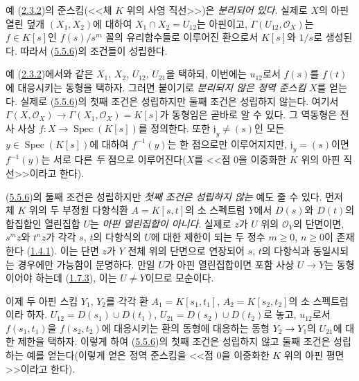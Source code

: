 \begin{examples}[5.5.11]
\label{I.5.5.11-ko}
예 (\hyperref[I.2.3.2-ko]{2.3.2})의 준스킴(<<체 $K$ 위의 사영
직선>>)은 \emph{분리되어 있다}. 실제로 $X$의 아핀 열린 덮개
$(X_1,X_2)$에 대하여 $X_1\cap X_2=U_{12}$는 아핀이고,
$\Gamma(U_{12},\mathscr{O}_X)$는 $f\in K[s]$인
$f(s)/s^m$ 꼴의 유리함수들로 이루어진 환으로서 $K[s]$와 $1/s$로
생성된다. 따라서 (\hyperref[I.5.5.6-ko]{5.5.6})의 조건들이
성립한다.

예 (\hyperref[I.2.3.2-ko]{2.3.2})에서와 같은 $X_1$, $X_2$,
$U_{12}$, $U_{21}$을 택하되, 이번에는 $u_{12}$로서 $f(s)$를
$f(t)$에 대응시키는 동형을 택하자. 그러면 붙이기로 \emph{분리되지
않은 정역 준스킴} $X$를 얻는다. 실제로
(\hyperref[I.5.5.6-ko]{5.5.6})의 첫째 조건은 성립하지만 둘째 조건은
성립하지 않는다. 여기서
$\Gamma(X,\mathscr{O}_X)\to\Gamma(X_1,\mathscr{O}_X)=K[s]$가
동형임은 곧바로 알 수 있다. 그 역동형은 전사 사상
$f:X\to\operatorname{Spec}(K[s])$를 정의한다. 또한
$\mathfrak{j}_y\neq(s)$인 모든
$y\in\operatorname{Spec}(K[s])$에 대하여 $f^{-1}(y)$는 한 점으로만
이루어지지만, $\mathfrak{j}_y=(s)$이면 $f^{-1}(y)$는 서로 다른
\emph{두} 점으로 이루어진다($X$를 <<점 $0$을 이중화한 $K$ 위의
아핀 직선>>이라고 한다).

(\hyperref[I.5.5.6-ko]{5.5.6})의 둘째 조건은 성립하지만
\emph{첫째 조건은 성립하지 않는} 예도 줄 수 있다. 먼저 체 $K$ 위의 두 부정원 다항식환
$A=K[s,t]$의 소 스펙트럼 $Y$에서 $D(s)$와 $D(t)$의 합집합인
열린집합 $U$는 \emph{아핀 열린집합이 아니다}. 실제로 $z$가 $U$ 위의
$\mathscr{O}_Y$의 단면이면, $s^m z$와 $t^n z$가 각각 $s$, $t$의
다항식의 $U$에 대한 제한이 되는 두 정수 $m\geq0$, $n\geq0$이
존재한다 (\hyperref[I.1.4.1-ko]{1.4.1}). 이는 단면 $z$가 $Y$ 전체
위의 단면으로 연장되어 $s$, $t$의 다항식과 동일시되는 경우에만
가능함이 분명하다. 만일 $U$가 아핀 열린집합이면 포함 사상
$U\to Y$는 동형이어야 하는데 (\hyperref[I.1.7.3-ko]{1.7.3}), 이는
$U\neq Y$이므로 모순이다.

이제 두 아핀 스킴 $Y_1$, $Y_2$를 각각 환
$A_1=K[s_1,t_1]$, $A_2=K[s_2,t_2]$의 소 스펙트럼이라 하자.
$U_{12}=D(s_1)\cup D(t_1)$,
$U_{21}=D(s_2)\cup D(t_2)$로 놓고, $u_{12}$로서
$f(s_1,t_1)$을 $f(s_2,t_2)$에 대응시키는 환의 동형에 대응하는
동형 $Y_2\to Y_1$의 $U_{21}$에 대한 제한을 택하자. 이렇게 하여
(\hyperref[I.5.5.6-ko]{5.5.6})의 첫째 조건은 성립하지 않고 둘째
조건은 성립하는 예를 얻는다(이렇게 얻은 정역 준스킴을 <<점 $0$을
이중화한 $K$ 위의 아핀 평면>>이라고 한다).
\end{examples}

